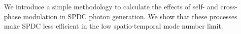 We introduce a simple methodology to calculate the effects of self- and cross-phase modulation in SPDC photon generation. We show that these processes make SPDC less efficient in the low spatio-temporal mode number limit.